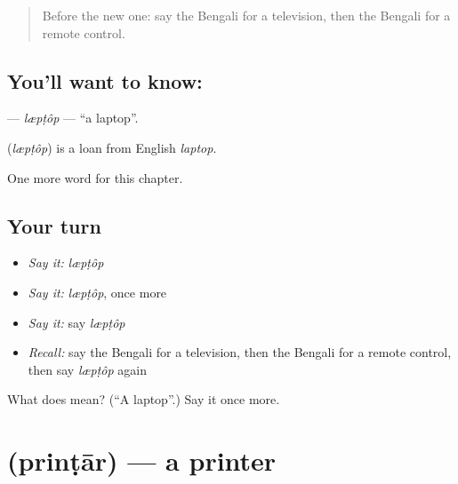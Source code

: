 \label{lesson:BN-C222-lptop}



\begin{quote}
Before the new one: say the Bengali for a television, then the Bengali for a remote control.
\end{quote}

\subsection*{You'll want to know: }
\textbf{} — \emph{læpṭôp} — \textquotedblleft{}a laptop\textquotedblright{}.

\begin{cousinweb}
\textbf{} (\emph{læpṭôp}) is a loan from English \emph{laptop}.
\end{cousinweb}

\begin{grammarlens}[title={What you've built}]
One more word for this chapter.
\end{grammarlens}

\subsection*{Your turn}
\begin{itemize}
\raggedright
  \item \emph{Say it:} \emph{læpṭôp}
  \item \emph{Say it:} \emph{læpṭôp}, once more
  \item \emph{Say it:} say \emph{læpṭôp}
  \item \emph{Recall:} say the Bengali for a television, then the Bengali for a remote control, then say \emph{læpṭôp} again
\end{itemize}

\begin{tcolorbox}[breakable,colback=teal!4,colframe=teal!35!black,title={Before you move on}]
What does  mean? (\textquotedblleft{}A laptop\textquotedblright{}.) Say it once more.
\end{tcolorbox}
\section[\texorpdfstring{\bn{প্রিন্টার} (prinṭār)}{প্রিন্টার (prinṭār)}]{ (prinṭār) — a printer}

\label{lesson:BN-C222-printar}



